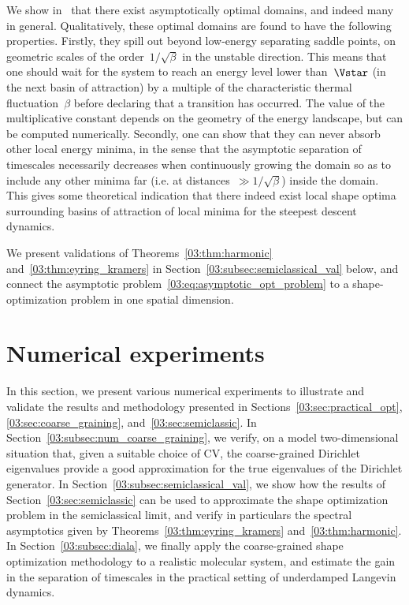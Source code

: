     We show in~\cite[Section 3.3]{BLS25a} that there exist asymptotically optimal domains, and indeed many in general. Qualitatively, these optimal domains are found to have the following properties. Firstly, they spill out beyond low-energy separating saddle points, on geometric scales of the order~$1/\sqrt\beta$ in the unstable direction. This means that one should wait for the system to reach an energy level lower than~$\Vstar$ (in the next basin of attraction) by a multiple of the characteristic thermal fluctuation~$\beta$ before declaring that a transition has occurred. The value of the multiplicative constant depends on the geometry of the energy landscape, but can be computed numerically.
    Secondly, one can show that they can never absorb other local energy minima, in the sense that the asymptotic separation of timescales necessarily decreases when continuously growing the domain so as to include any other minima far (i.e. at distances~$\gg1/\sqrt\beta$) inside the domain. This gives some theoretical indication that there indeed exist local shape optima surrounding basins of attraction of local minima for the steepest descent dynamics.

    We present validations of Theorems~\ref{03:thm:harmonic} and~\ref{03:thm:eyring_kramers} in Section~\ref{03:subsec:semiclassical_val} below, and connect the asymptotic problem~\eqref{03:eq:asymptotic_opt_problem} to a shape-optimization problem in one spatial dimension.
\section{Numerical experiments}
\label{03:sec:numerical}
In this section, we present various numerical experiments to illustrate and validate the results and methodology presented in Sections~\ref{03:sec:practical_opt}, \ref{03:sec:coarse_graining}, and~\ref{03:sec:semiclassic}. In Section~\ref{03:subsec:num_coarse_graining}, we verify, on a model two-dimensional situation that, given a suitable choice of CV, the coarse-grained Dirichlet eigenvalues provide a good approximation for the true eigenvalues of the Dirichlet generator.
In Section~\ref{03:subsec:semiclassical_val}, we show how the results of Section~\ref{03:sec:semiclassic} can be used to approximate the shape optimization problem in the semiclassical limit, and verify in particulars the spectral asymptotics given by Theorems~\ref{03:thm:eyring_kramers} and~\ref{03:thm:harmonic}.
In Section~\ref{03:subsec:diala}, we finally apply the coarse-grained shape optimization methodology to a realistic molecular system, and estimate the gain in the separation of timescales in the practical setting of underdamped Langevin dynamics.

